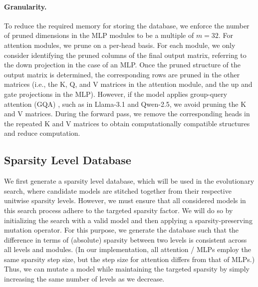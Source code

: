 \paragraph{Granularity.} 
To reduce the required memory for storing the database, we enforce the number of pruned dimensions in the MLP modules to be a multiple of $m=32$. For attention modules, we prune on a per-head basis. For each module, we only consider identifying the pruned columns of the final output matrix, referring to the down projection in the case of an MLP. Once the pruned structure of the output matrix is determined, the corresponding rows are pruned in the other matrices (i.e., the K, Q, and V matrices in the attention module, and the up and gate projections in the MLP). However, if the model applies group-query attention (GQA) \citep{ainslie2023gqa}, such as in Llama-3.1 and Qwen-2.5, we avoid pruning the K and V matrices. During the forward pass, we remove the corresponding heads in the repeated K and V matrices to obtain computationally compatible structures and reduce computation.

\vspace{-1em}

\subsection{Sparsity Level Database}
\label{sec:method:database}
We first generate a sparsity level database, which will be used in the evolutionary search, where candidate models are stitched together from their respective unitwise sparsity levels. However, we must ensure that all considered models in this search process adhere to the targeted sparsity factor. We will do so by initializing the search with a valid model and then applying a sparsity-preserving mutation operator. For this purpose, we generate the database such that the difference in terms of (absolute) sparsity between two levels is consistent across all levels and modules. (In our implementation, all attention / MLPs employ the same sparsity step size, but the step size for attention differs from that of MLPs.) Thus, we can mutate a model while maintaining the targeted sparsity by simply increasing the same number of levels as we decrease.

